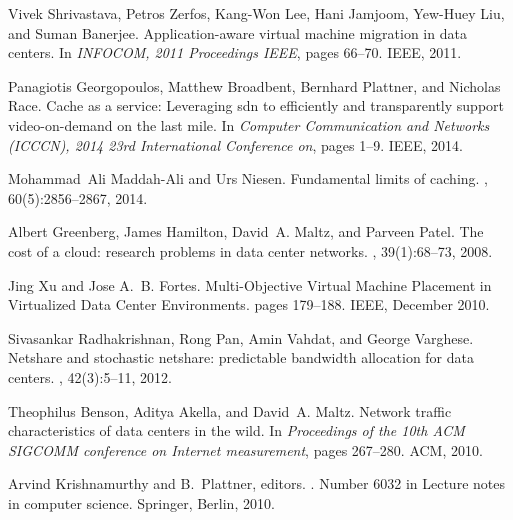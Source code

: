 \begin{thebibliography}{10}

Vivek Shrivastava, Petros Zerfos, Kang-Won Lee, Hani Jamjoom, Yew-Huey Liu, and
  Suman Banerjee.
\newblock Application-aware virtual machine migration in data centers.
\newblock In {\em {INFOCOM}, 2011 {Proceedings} {IEEE}}, pages 66--70. IEEE,
  2011.

Panagiotis Georgopoulos, Matthew Broadbent, Bernhard Plattner, and Nicholas
  Race.
\newblock Cache as a service: {Leveraging} sdn to efficiently and transparently
  support video-on-demand on the last mile.
\newblock In {\em Computer {Communication} and {Networks} ({ICCCN}), 2014 23rd
  {International} {Conference} on}, pages 1--9. IEEE, 2014.

Mohammad~Ali Maddah-Ali and Urs Niesen.
\newblock Fundamental limits of caching.
, 60(5):2856--2867,
  2014.

Albert Greenberg, James Hamilton, David~A. Maltz, and Parveen Patel.
\newblock The cost of a cloud: research problems in data center networks.
, 39(1):68--73, 2008.

Jing Xu and Jose A.~B. Fortes.
\newblock Multi-{Objective} {Virtual} {Machine} {Placement} in {Virtualized}
  {Data} {Center} {Environments}.
\newblock pages 179--188. IEEE, December 2010.

Sivasankar Radhakrishnan, Rong Pan, Amin Vahdat, and George Varghese.
\newblock Netshare and stochastic netshare: predictable bandwidth allocation
  for data centers.
, 42(3):5--11, 2012.

Theophilus Benson, Aditya Akella, and David~A. Maltz.
\newblock Network traffic characteristics of data centers in the wild.
\newblock In {\em Proceedings of the 10th {ACM} {SIGCOMM} conference on
  {Internet} measurement}, pages 267--280. ACM, 2010.

Arvind Krishnamurthy and B.~Plattner, editors.
.
\newblock Number 6032 in Lecture notes in computer science. Springer, Berlin,
  2010.


\end{thebibliography}
